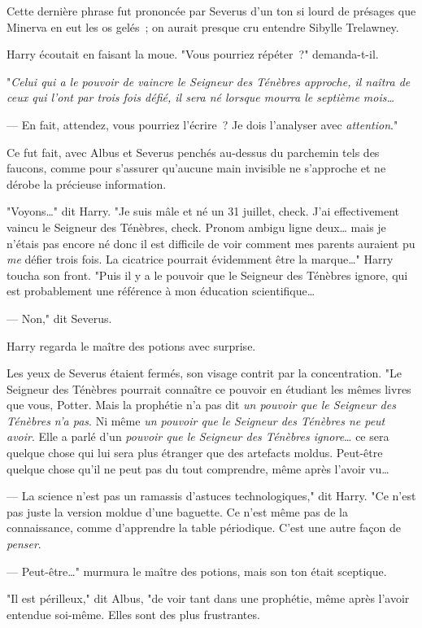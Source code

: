 Cette dernière phrase fut prononcée par Severus d'un ton si lourd de présages que Minerva en eut les os gelés~; on aurait presque cru entendre Sibylle Trelawney.

Harry écoutait en faisant la moue. "Vous pourriez répéter~?" demanda-t-il.

"\emph{Celui qui a le pouvoir de vaincre le Seigneur des Ténèbres approche, il naîtra de ceux qui l'ont par trois fois défié, il sera né lorsque mourra le septième mois…}

--- En fait, attendez, vous pourriez l'écrire~? Je dois l'analyser avec \emph{attention}."

Ce fut fait, avec Albus et Severus penchés au-dessus du parchemin tels des faucons, comme pour s'assurer qu'aucune main invisible ne s'approche et ne dérobe la précieuse information.

"Voyons…" dit Harry. "Je suis mâle et né un 31 juillet, check. J'ai effectivement vaincu le Seigneur des Ténèbres, check. Pronom ambigu ligne deux… mais je n'étais pas encore né donc il est difficile de voir comment mes parents auraient pu \emph{me} défier trois fois. La cicatrice pourrait évidemment être la marque…" Harry toucha son front. "Puis il y a le pouvoir que le Seigneur des Ténèbres ignore, qui est probablement une référence à mon éducation scientifique…

--- Non," dit Severus.

Harry regarda le maître des potions avec surprise.

Les yeux de Severus étaient fermés, son visage contrit par la concentration. "Le Seigneur des Ténèbres pourrait connaître ce pouvoir en étudiant les mêmes livres que vous, Potter. Mais la prophétie n'a pas dit \emph{un pouvoir que le Seigneur des Ténèbres n'a pas}. Ni même \emph{un pouvoir que le Seigneur des Ténèbres ne peut avoir}. Elle a parlé d'un \emph{pouvoir que le Seigneur des Ténèbres ignore}… ce sera quelque chose qui lui sera plus étranger que des artefacts moldus. Peut-être quelque chose qu'il ne peut pas du tout comprendre, même après l'avoir vu…

--- La science n'est pas un ramassis d'astuces technologiques," dit Harry. "Ce n'est pas juste la version moldue d'une baguette. Ce n'est même pas de la connaissance, comme d'apprendre la table périodique. C'est une autre façon de \emph{penser}.

--- Peut-être…" murmura le maître des potions, mais son ton était sceptique.

"Il est périlleux," dit Albus, "de voir tant dans une prophétie, même après l'avoir entendue soi-même. Elles sont des plus frustrantes.


